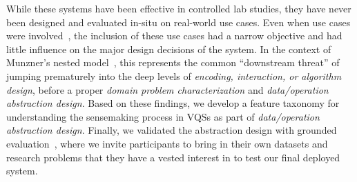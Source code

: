\par While these systems have been effective in controlled lab studies, they have never been designed and evaluated in-situ on real-world use cases. Even when use cases were involved~\cite{Hochheiser2004,correll2016semantics}, the inclusion of these use cases had a narrow objective and had little influence on the major design decisions of the system. In the context of Munzner's nested model~\cite{munzner2009nested}, this represents the common ``downstream threat'' of jumping prematurely into the deep levels of \textit{encoding, interaction, or algorithm design}, before a proper \textit{domain problem characterization} and \textit{data/operation abstraction design}.  Based on these findings, we develop a feature taxonomy for understanding the sensemaking process in VQSs as part of \textit{data/operation abstraction design}. Finally, we validated the abstraction design with grounded evaluation~\cite{Plaisant2004,Isenberg2008}, where we invite participants to bring in their own datasets and research problems that they have a vested interest in to test our final deployed system. 
